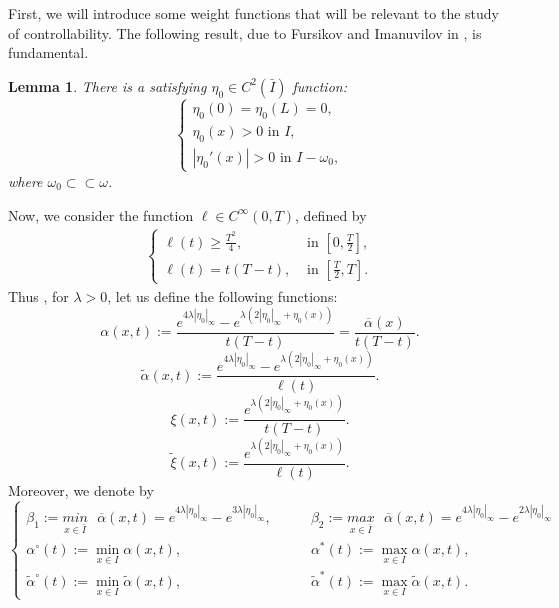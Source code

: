 \documentclass[11pt,a4paper]{amsart}
\numberwithin{equation}{section}
\newtheorem{lemma}{Lemma}[section]
\begin{document}
First, we will introduce some weight functions that will be relevant to the study of controllability. The following  result, due to Fursikov and Imanuvilov in \cite{FurImanu}, is fundamental.
\begin{lemma}
	There is a satisfying $\eta_0 \in C^2(\bar{I})$ function:
	\begin{equation} \label{imafur}
    		\begin{cases}
			\eta_0(0)=\eta_0(L)=0, \\
			\eta_0(x)>0 \text{  in  }  I, \\
			|\eta_0'(x)|>0 \text{  in  } I - \omega_0,
		\end{cases}
	\end{equation}    
	where $\omega_0 \subset \subset \omega$.
\end{lemma}Now, we consider the function $\ell \in C^{\infty}(0,T)$, defined by
\begin{align}\label{llll_fun}
    \begin{cases}
	\ell(t)\geq \frac{T^2}{4}, &\text{ in }[0,\frac{T}{2}],\\
	\ell(t)= t(T-t), &\text{ in }[\frac{T}{2},T].
    \end{cases}
\end{align}Thus , for $\lambda>0$, let us define the following functions:
\begin{equation} \label{alfa}
\alpha(x,t):=\frac{e^{4\lambda|\eta_0|_\infty}-e^{\lambda (2|\eta_0|_\infty+\eta_0(x))}}{t(T-t)} =\frac{\overline{\alpha}(x)}{t(T-t)}.
\end{equation}
\begin{equation}\label{alfa-2}
	\tilde{\alpha}(x,t):=\frac{e^{4\lambda|\eta_0|_\infty}-e^{\lambda (2|\eta_0|_\infty+\eta_0(x))}}{\ell(t)}.
\end{equation}
    \begin{equation}
    \xi(x,t):=\frac{e^{\lambda (2|\eta_0|_\infty+\eta_0(x))}}{t(T-t)} .
\end{equation}
\begin{equation}
    \tilde{\xi}(x,t):=\frac{e^{\lambda (2|\eta_0|_\infty+\eta_0(x))}}{\ell(t)} .
\end{equation}Moreover, we denote by 
\begin{equation}\label{minmaxminn}
	\begin{cases}
    \beta_1:=\underset{x \in \bar{I}}{min}\text{  }\overline{\alpha}(x,t)= e^{4\lambda|\eta_0|_\infty}-e^{3\lambda |\eta_0|_\infty},\qquad  
    &\beta_2:=\underset{x \in \bar{I}}{max}\text{  }\overline{\alpha}(x,t)=e^{4\lambda|\eta_0|_\infty}-e^{2\lambda|\eta_0|_\infty}\\
    \displaystyle\alpha^{\circ}(t):=\min_{x\in I}\alpha(x,t),
     &\displaystyle \alpha^*(t):=\max_{x\in I}\alpha(x,t),\\
    \displaystyle\tilde{\alpha}^{\circ}(t):=\min_{x\in I}\tilde{\alpha}(x,t),
     &\displaystyle \tilde{\alpha}^*(t):=\max_{x\in I}\tilde{\alpha}(x,t).
    \end{cases}
\end{equation}
\end{document}
